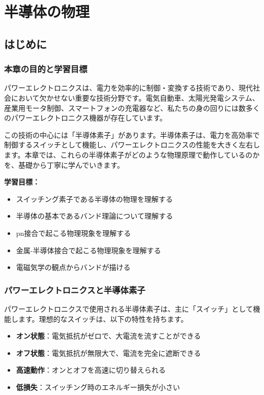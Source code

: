 \chapter{半導体の物理}

\section{はじめに}

\subsection{本章の目的と学習目標}

パワーエレクトロニクスは、電力を効率的に制御・変換する技術であり、現代社会において欠かせない重要な技術分野です。電気自動車、太陽光発電システム、産業用モータ制御、スマートフォンの充電器など、私たちの身の回りには数多くのパワーエレクトロニクス機器が存在しています。

この技術の中心には「半導体素子」があります。半導体素子は、電力を高効率で制御するスイッチとして機能し、パワーエレクトロニクスの性能を大きく左右します。本章では、これらの半導体素子がどのような物理原理で動作しているのかを、基礎から丁寧に学んでいきます。

\textbf{学習目標：}
\begin{itemize}
\item スイッチング素子である半導体の物理を理解する
\item 半導体の基本であるバンド理論について理解する
\item pn接合で起こる物理現象を理解する
\item 金属-半導体接合で起こる物理現象を理解する
\item 電磁気学の観点からバンドが描ける
\end{itemize}

\subsection{パワーエレクトロニクスと半導体素子}

パワーエレクトロニクスで使用される半導体素子は、主に「スイッチ」として機能します。理想的なスイッチは、以下の特性を持ちます。

\begin{itemize}
\item \textbf{オン状態}：電気抵抗がゼロで、大電流を流すことができる
\item \textbf{オフ状態}：電気抵抗が無限大で、電流を完全に遮断できる
\item \textbf{高速動作}：オンとオフを高速に切り替えられる
\item \textbf{低損失}：スイッチング時のエネルギー損失が小さい
\end{itemize}

